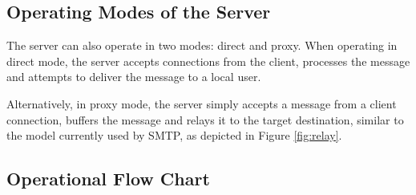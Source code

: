 \subsection{Operating Modes of the Server}

The server can also operate in two modes: direct and proxy. When
operating in direct mode, the server accepts connections from the 
client, processes the message and attempts to deliver the message to a 
local user.


Alternatively, in proxy mode, the server simply accepts a message from a
client connection, buffers the message and relays it to the target 
destination, similar to the model currently used by SMTP, as depicted in
Figure \ref{fig:relay}.

\subsection{Operational Flow Chart}




